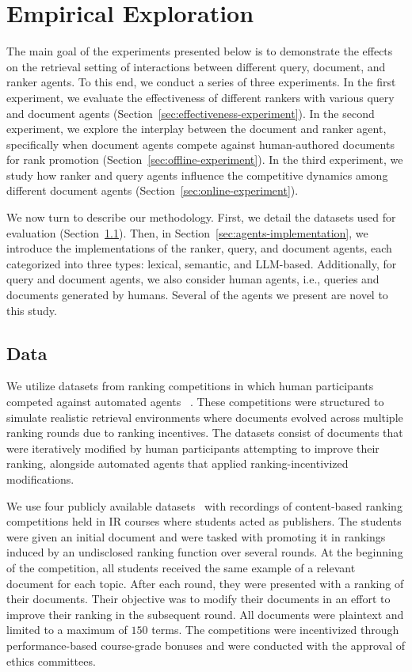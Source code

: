 \section{Empirical Exploration}
\label{sec:experimental-settings}

The main goal of the experiments presented below is to demonstrate the effects on the retrieval setting of interactions between different query, document, and ranker agents.
To this end, we conduct a series of three experiments. 
In the first experiment, we evaluate the effectiveness of different rankers
with various query and document agents (Section~\ref{sec:effectiveness-experiment}).
In the second experiment, we explore the interplay between the document and ranker agent, specifically when document agents compete against human-authored documents for rank promotion (Section~\ref{sec:offline-experiment}).
In the third experiment, we
study how ranker and query agents influence the competitive dynamics among different document agents (Section~\ref{sec:online-experiment}).

We now turn to describe our methodology. First, we detail the datasets used for evaluation (Section~\ref{sec:data}). Then, in Section~\ref{sec:agents-implementation}, we introduce the implementations of the ranker, query, and document agents, each categorized into three types: lexical, semantic, and LLM-based. Additionally, for query and document agents, we also consider human agents, i.e., queries and documents generated by humans.
Several of the agents we present are novel to this study.

\subsection{Data}
\label{sec:data}

We utilize datasets from ranking competitions in which human participants competed against automated agents ~\cite{Greg-bot, Niv, MultQueries}. These competitions were structured to simulate realistic retrieval environments where documents evolved across multiple ranking rounds due to ranking incentives. The datasets consist of documents that were iteratively modified by human participants attempting to improve their ranking, alongside automated agents that applied ranking-incentivized modifications.

We use four publicly available datasets~\cite{Greg-bot, Niv, MultQueries} with recordings of content-based ranking competitions held in IR courses where students acted as publishers. The students were given an initial document and were tasked with promoting it in rankings induced by an undisclosed ranking function over several rounds. At the
beginning of the competition, all students received the same example of a relevant document for each topic. After each round, they were presented with a ranking of their documents.
Their objective was to modify their documents in an effort to improve their ranking in the subsequent round. All documents were plaintext and limited to a maximum of $150$ terms. The competitions were incentivized through performance-based course-grade bonuses and were conducted with the approval of ethics committees.


